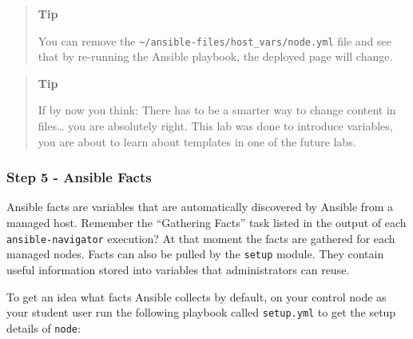 \begin{quote}
\textbf{Tip}

You can remove the \texttt{\textasciitilde{}/ansible-files/host\_vars/node.yml} file and
see that by re-running the Ansible playbook, the deployed page will change.
\end{quote}

\begin{quote}
\textbf{Tip}

If by now you think: There has to be a smarter way to change content in
files\ldots\hspace{0pt} you are absolutely right. This lab was done to
introduce variables, you are about to learn about templates in one of
the future labs.
\end{quote}

\hypertarget{step-5---ansible-facts}{%
\subsubsection{Step 5 - Ansible Facts}\label{step-5---ansible-facts}}

Ansible facts are variables that are automatically discovered by Ansible
from a managed host. Remember the ``Gathering Facts'' task listed in the
output of each \texttt{ansible-navigator} execution? At that moment the
facts are gathered for each managed nodes. Facts can also be pulled by
the \texttt{setup} module. They contain useful information stored into
variables that administrators can reuse.

To get an idea what facts Ansible collects by default, on your control
node as your student user run the following playbook called \texttt{setup.yml} to get the setup
details of \texttt{node}:

\begin{Shaded}
\begin{Highlighting}[]
\PreprocessorTok{{-}{-}{-}}
\KeywordTok{{-}}\AttributeTok{ }\KeywordTok{:}
\AttributeTok{  }\KeywordTok{:}
\AttributeTok{  }\KeywordTok{:}
\AttributeTok{    }\KeywordTok{{-}}\AttributeTok{ }\KeywordTok{:}
\AttributeTok{      }\KeywordTok{:}
\AttributeTok{        }\KeywordTok{:}
\AttributeTok{          }\KeywordTok{{-}}
\AttributeTok{      }\KeywordTok{:}
\AttributeTok{    }\KeywordTok{{-}}\AttributeTok{ }\KeywordTok{:}
\AttributeTok{        }\KeywordTok{:}
\end{Highlighting}
\end{Shaded}

